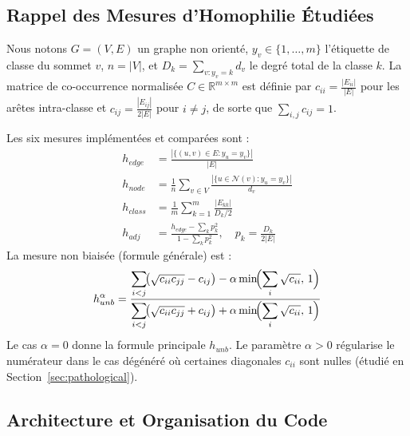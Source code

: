 \documentclass[11pt,a4paper]{article}
\begin{document}
\subsection{Rappel des Mesures d'Homophilie Étudiées}
\label{sec:measures_def}

Nous notons $G = (V, E)$ un graphe non orienté, $y_v \in \{1, \dots, m\}$ l'étiquette de classe du sommet $v$, $n = |V|$, et $D_k = \sum_{v: y_v = k} d_v$ le degré total de la classe $k$. La matrice de co-occurrence normalisée $C \in \mathbb{R}^{m \times m}$ est définie par $c_{ii} = \frac{|E_{ii}|}{|E|}$ pour les arêtes intra-classe et $c_{ij} = \frac{|E_{ij}|}{2|E|}$ pour $i \neq j$, de sorte que $\sum_{i,j} c_{ij} = 1$.

Les six mesures implémentées et comparées sont :
\begin{align}
  h_{edge} &= \frac{|\{(u,v)\in E : y_u = y_v\}|}{|E|} \label{eq:hedge}\\[3pt]
  h_{node} &= \frac{1}{n} \sum_{v \in V} \frac{|\{u \in \mathcal{N}(v) : y_u = y_v\}|}{d_v} \label{eq:hnode}\\[3pt]
  h_{class} &= \frac{1}{m} \sum_{k=1}^{m} \frac{|E_{kk}|}{D_k / 2} \label{eq:hclass}\\[3pt]
  h_{adj} &= \frac{h_{edge} - \sum_k p_k^2}{1 - \sum_k p_k^2}, \quad p_k = \frac{D_k}{2|E|} \label{eq:hadj}
\end{align}
La mesure non biaisée (formule générale) est :
\begin{equation}
  h_{unb}^\alpha = \frac{\displaystyle\sum_{i < j}\!\bigl(\sqrt{c_{ii}c_{jj}} - c_{ij}\bigr) - \alpha \min\!\Bigl(\sum_i \sqrt{c_{ii}},\,1\Bigr)}%
                       {\displaystyle\sum_{i < j}\!\bigl(\sqrt{c_{ii}c_{jj}} + c_{ij}\bigr) + \alpha \min\!\Bigl(\sum_i \sqrt{c_{ii}},\,1\Bigr)}
  \label{eq:hunb}
\end{equation}
Le cas $\alpha = 0$ donne la formule principale $h_{unb}$. Le paramètre $\alpha > 0$ régularise le numérateur dans le cas dégénéré où certaines diagonales $c_{ii}$ sont nulles (étudié en Section~\ref{sec:pathological}).

\subsection{Architecture et Organisation du Code}
\end{document}

